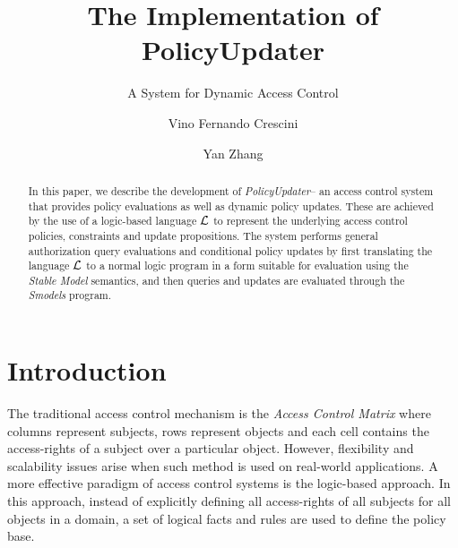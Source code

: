 \documentclass{llncs}
\begin{document}
  \long{}

  \title{The Implementation of PolicyUpdater}
  \subtitle{A System for Dynamic Access Control}

  \author{Vino Fernando Crescini \and Yan Zhang}


  \maketitle

  \begin{abstract}
    In this paper, we describe the development of \emph{PolicyUpdater}\footnotemark -- an
    access control system that provides policy evaluations as well as dynamic
    policy updates. These are achieved by the use of a logic-based language
    $\cal{L}$ to represent the underlying access control policies, constraints
    and update propositions. The system performs general authorization query
    evaluations and conditional policy updates by first translating the language
    $\cal{L}$ to a normal logic program in a form suitable for evaluation using
    the \emph{Stable Model} semantics, and then queries and updates are
    evaluated through the \emph{Smodels} program.
  \end{abstract}


  \section{Introduction}

    The traditional access control mechanism is the \emph{Access Control Matrix}
    where columns represent subjects, rows represent objects and each cell
    contains the access-rights of a subject over a particular object. However,
    flexibility and scalability issues arise when such method is used on
    real-world applications. A more effective paradigm of access control
    systems is the logic-based approach. In this approach, instead of
    explicitly defining all access-rights of all subjects for all objects
    in a domain, a set of logical facts and rules are used to define the
    policy base. 
\end{document}
